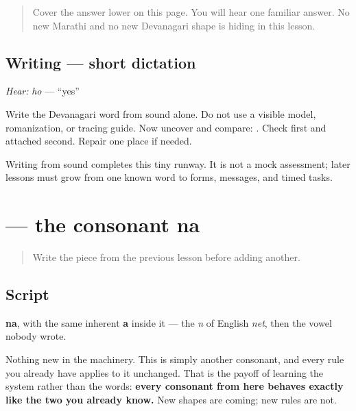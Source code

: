 \label{lesson:MR-W01-ho-dictation}



\begin{quote}
Cover the answer lower on this page. You will hear one familiar answer. No new Marathi and no new Devanagari shape is hiding in this lesson.
\end{quote}

\subsection*{Writing — short dictation}
\emph{Hear:} \emph{ho} — \textquotedblleft{}yes\textquotedblright{}

Write the Devanagari word from sound alone. Do not use a visible model, romanization, or tracing guide. Now uncover and compare: \textbf{}. Check \textbf{} first and attached \textbf{} second. Repair one place if needed.

\begin{tcolorbox}[breakable,colback=teal!4,colframe=teal!35!black,title={Before you move on}]
Writing from sound completes this tiny runway. It is not a mock assessment; later lessons must grow from one known word to forms, messages, and timed tasks.
\end{tcolorbox}
\section[\texorpdfstring{\mr{न} (na)}{न (na)}]{ — the consonant na}

\label{lesson:MR-W01-na}



\begin{quote}
Write the piece from the previous lesson before adding another.
\end{quote}

\subsection*{Script}

\begin{quote}
\end{quote}

\textbf{na}, with the same inherent \textbf{a} inside it — the \emph{n} of English \emph{net}, then the vowel nobody wrote.

Nothing new in the machinery. This is simply another consonant, and every rule you already have applies to it unchanged. That is the payoff of learning the system rather than the words: \textbf{every consonant from here behaves exactly like the two you already know.} New shapes are coming; new rules are not.

